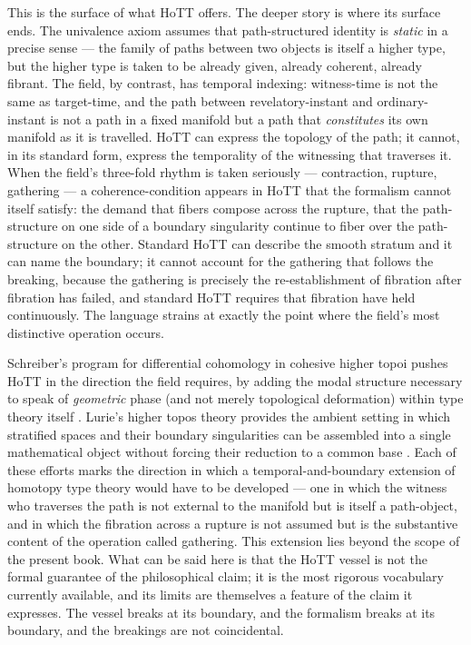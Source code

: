 This is the surface of what HoTT offers. The deeper story is where its surface ends. The univalence axiom assumes that path-structured identity is \emph{static} in a precise sense --- the family of paths between two objects is itself a higher type, but the higher type is taken to be already given, already coherent, already fibrant. The field, by contrast, has temporal indexing: witness-time is not the same as target-time, and the path between revelatory-instant and ordinary-instant is not a path in a fixed manifold but a path that \emph{constitutes} its own manifold as it is travelled. HoTT can express the topology of the path; it cannot, in its standard form, express the temporality of the witnessing that traverses it. When the field's three-fold rhythm is taken seriously --- contraction, rupture, gathering --- a coherence-condition appears in HoTT that the formalism cannot itself satisfy: the demand that fibers compose across the rupture, that the path-structure on one side of a boundary singularity continue to fiber over the path-structure on the other. Standard HoTT can describe the smooth stratum and it can name the boundary; it cannot account for the gathering that follows the breaking, because the gathering is precisely the re-establishment of fibration after fibration has failed, and standard HoTT requires that fibration have held continuously. The language strains at exactly the point where the field's most distinctive operation occurs.

Schreiber's program for differential cohomology in cohesive higher topoi pushes HoTT in the direction the field requires, by adding the modal structure necessary to speak of \emph{geometric} phase (and not merely topological deformation) within type theory itself \cite{schreiber_2011}. Lurie's higher topos theory provides the ambient setting in which stratified spaces and their boundary singularities can be assembled into a single mathematical object without forcing their reduction to a common base \cite{lurie_2009}. Each of these efforts marks the direction in which a temporal-and-boundary extension of homotopy type theory would have to be developed --- one in which the witness who traverses the path is not external to the manifold but is itself a path-object, and in which the fibration across a rupture is not assumed but is the substantive content of the operation called gathering. This extension lies beyond the scope of the present book. What can be said here is that the HoTT vessel is not the formal guarantee of the philosophical claim; it is the most rigorous vocabulary currently available, and its limits are themselves a feature of the claim it expresses. The vessel breaks at its boundary, and the formalism breaks at its boundary, and the breakings are not coincidental.

